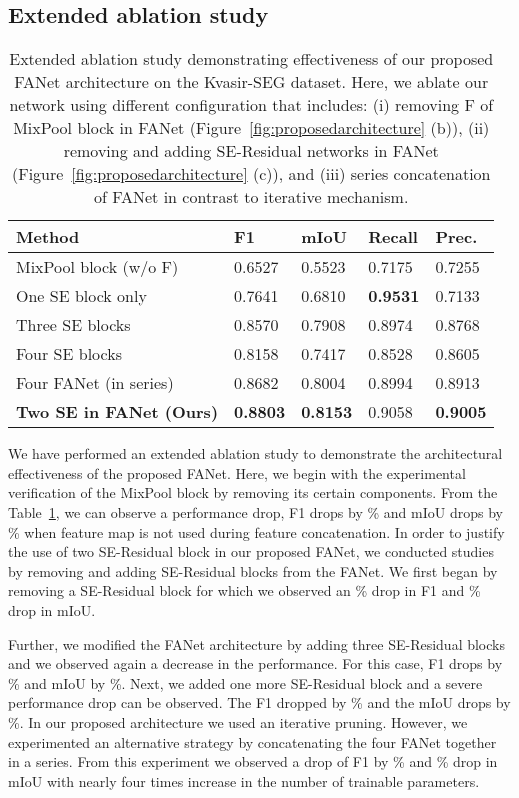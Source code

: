 \documentclass[journal]{IEEEtran}
\begin{document}
\subsection{Extended ablation study}
\begin{table}[!t]
\centering
\footnotesize
\caption{Extended ablation study demonstrating effectiveness of our proposed FANet architecture on the Kvasir-SEG dataset. Here, we ablate our network using different configuration that includes: (i) removing F of MixPool block in {FANet (Figure~\ref{fig:proposedarchitecture}} (b)), (ii) removing and adding SE-Residual networks in FANet {(Figure~\ref{fig:proposedarchitecture} (c))}, and (iii) series concatenation of FANet in contrast to iterative mechanism.}

\begin{tabular}{@{}l|l|l|l|l@{}}
\toprule
\textbf{Method} &\textbf{F1} &\textbf{mIoU} &\textbf{Recall} &\textbf{Prec.} \\ 
\midrule
MixPool block (w/o F) &0.6527 &0.5523 &0.7175 &0.7255  \\ One SE block only &0.7641 &0.6810 &\textbf{0.9531} &0.7133  \\ Three SE blocks &0.8570 &0.7908 &0.8974 &0.8768  \\ 

Four SE blocks &0.8158 &0.7417 &0.8528 &0.8605  \\
Four FANet (in series) &0.8682 &0.8004 &0.8994 &0.8913  \\
\textbf{Two SE in FANet (Ours)} &\textbf{0.8803} &\textbf{0.8153} &0.9058 &\textbf{0.9005} \\\bottomrule
\end{tabular}
\label{tab:extended-ablation-study}
\end{table}
We have performed an extended ablation study to demonstrate the architectural effectiveness of the proposed FANet. Here, we begin with the experimental verification of the MixPool block by removing its certain components. From the Table~\ref{tab:extended-ablation-study}, we can observe a performance drop, F1 drops by \% and mIoU drops by \% when feature map  is not used during feature concatenation. In order to justify the use of two SE-Residual block in our proposed FANet, we conducted studies by removing and adding SE-Residual blocks from the FANet. We first began by removing a SE-Residual block for which we observed an \% drop in F1 and \% drop in mIoU. 

Further, we modified the FANet architecture by adding three SE-Residual blocks and we observed again a decrease in the performance. For this case, F1 drops by \% and mIoU by \%. Next, we added one more SE-Residual block and a severe performance drop can be observed. The F1 dropped by \% and the mIoU drops by \%. In our proposed architecture we used an iterative pruning. However, we experimented an alternative strategy by concatenating the four FANet together in a series. From this experiment we observed a drop of F1 by \% and \% drop in mIoU  with nearly four times increase in the number of trainable parameters.
\end{document}

